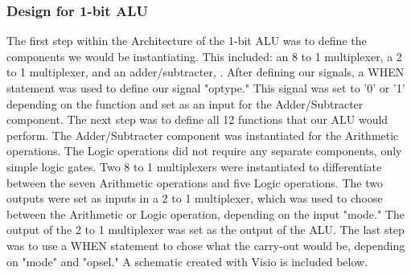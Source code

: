 \documentclass[paper=letter, fontsize=11pt]{scrartcl}
\numberwithin{equation}{section} %
\numberwithin{figure}{section} %
\numberwithin{table}{section} %
\begin{document}
\subsubsection{Design for 1-bit ALU}
\begin{flushleft}
	The first step within the Architecture of the 1-bit ALU was to define the components we would be instantiating. This included: an 8 to 1 multiplexer, a 2 to 1 multiplexer, and an adder/subtracter, . After defining our signals, a WHEN statement was used to define our signal "optype." This signal was set to '0' or '1' depending on the function and set as an input for the Adder/Subtracter component. The next step was to define all 12 functions that our ALU would perform. The Adder/Subtracter component was instantiated for the Arithmetic operations. The Logic operations did not require any separate components, only simple logic gates. Two 8 to 1 multiplexers were instantiated to differentiate between the seven Arithmetic operations and five Logic operations. The two outputs were set as inputs in a 2 to 1 multiplexer, which was used to choose between the Arithmetic or Logic operation, depending on the input "mode." The output of the 2 to 1 multiplexer was set as the output of the ALU. The last step was to use a WHEN statement to chose what the carry-out would be, depending on "mode" and "opsel." A schematic created with Visio is included below.      
\end{flushleft}
	\centering
\end{document}
